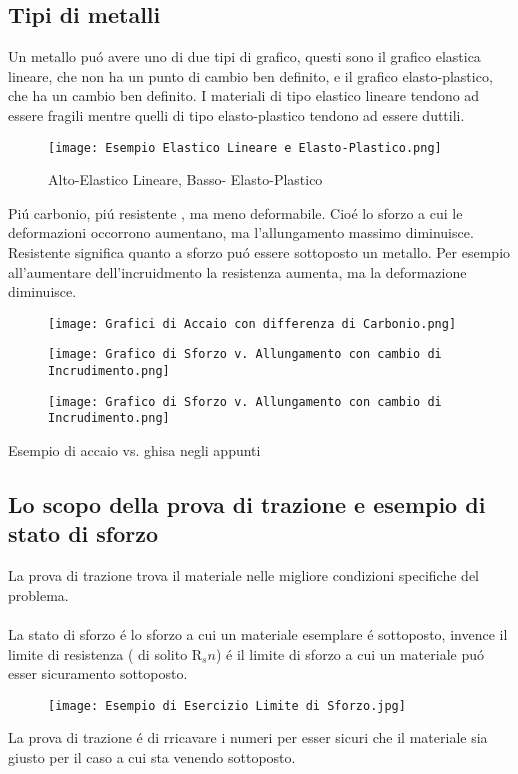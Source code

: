 \documentclass{article}
\begin{document}
{        \subsection{Tipi di metalli}
            Un metallo pu\'o avere uno di due tipi di grafico, questi sono il grafico elastica lineare, che non ha un punto di cambio ben definito, e il grafico elasto-plastico, che ha un cambio ben definito. I materiali di tipo elastico lineare tendono ad essere fragili mentre quelli di tipo elasto-plastico tendono ad essere duttili.
            \begin{figure}[!h]
                    \centering
                    \texttt{[image: Esempio Elastico Lineare e Elasto-Plastico.png]}
                    \caption{Alto-Elastico Lineare, Basso- Elasto-Plastico}
            \end{figure}
            Pi\'u carbonio, pi\'u resistente , ma meno deformabile. Cio\'e lo sforzo a cui le deformazioni occorrono aumentano, ma l'allungamento massimo diminuisce. Resistente significa quanto a sforzo pu\'o essere sottoposto un metallo. Per esempio all'aumentare dell'incruidmento la  resistenza aumenta, ma la deformazione diminuisce.
            \begin{figure}[!h]
                    \centering
                    \texttt{[image: Grafici di Accaio con differenza di Carbonio.png]}
            \end{figure}
            \begin{figure}[!h]
                    \centering
                    \texttt{[image: Grafico di Sforzo v. Allungamento con cambio di Incrudimento.png]}
            \end{figure}
            \begin{figure}[!h]
                    \centering
                    \texttt{[image: Grafico di Sforzo v. Allungamento con cambio di Incrudimento.png]}
            \end{figure}
            Esempio di accaio vs. ghisa negli appunti
        \subsection{Lo scopo della prova di trazione e esempio di stato di sforzo}
            La prova di trazione trova il materiale nelle migliore condizioni specifiche del problema.\\ \\
            La stato di sforzo \'e lo sforzo a cui un materiale esemplare \'e sottoposto, invence il limite di resistenza ( di solito R$_sn$) \'e il limite di sforzo a cui un materiale pu\'o esser sicuramento sottoposto.
            \begin{figure}[!h]
                    \centering
                    \texttt{[image: Esempio di Esercizio Limite di Sforzo.jpg]}
            \end{figure}
            La prova di trazione \'e di rricavare i numeri per esser sicuri che il materiale sia giusto per il caso a cui sta venendo sottoposto.
}
\end{document}
